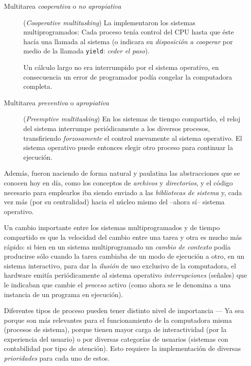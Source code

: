 \documentclass[11pt,fleqn]{book} %
\begin{document}
\begin{description}
\item[Multitarea \emph{cooperativa} o \emph{no apropiativa}] (\emph{Cooperative      multitasking}) La implementaron los sistemas multiprogramados: Cada
     proceso tenía control del CPU hasta que éste hacía una llamada al
     sistema (o indicara su \emph{disposición a cooperar} por medio de la
     llamada \texttt{yield}: \emph{ceder el paso}).

     Un cálculo largo no era interrumpido por el sistema operativo,
     en consecuencia un error de programador podía congelar la
     computadora completa.
\item[Multitarea \emph{preventiva} o \emph{apropiativa}] (\emph{Preemptive      multitasking}) En los sistemas de tiempo compartido, el reloj del
     sistema interrumpe periódicamente a los diversos procesos,
     transfiriendo \emph{forzosamente} el control nuevamente al sistema
     operativo. El sistema operativo puede entonces elegir 
     otro proceso para continuar la ejecución.
\end{description}

Además, fueron naciendo de forma natural y paulatina las abstracciones
que se conocen hoy en día, como los conceptos de \emph{archivos} y
\emph{directorios}, y el código necesario para emplearlos iba siendo
enviado a las \emph{bibliotecas de sistema} y, cada vez más (por
su centralidad) hacia el núcleo mismo del –ahora sí– sistema
operativo.

Un cambio importante
entre los sistemas multiprogramados y de tiempo compartido es que la
velocidad del cambio entre una tarea y otra es mucho más rápido: si
bien en un sistema multiprogramado un \emph{cambio de contexto} podía
producirse sólo cuando la tarea cambiaba de un modo de
ejecución a otro, en un sistema interactivo, para dar la \emph{ilusión} de uso exclusivo de la
computadora, el hardware emitía periódicamente al sistema operativo
\emph{interrupciones} (señales) que le indicaban que cambie el \emph{proceso} activo 
(como ahora se le denomina a una instancia de un programa en ejecución).

Diferentes tipos de proceso pueden tener distinto nivel de importancia
— Ya sea porque son más relevantes para el funcionamiento de la
computadora misma (procesos de sistema), porque tienen mayor carga de
interactividad (por la experiencia del usuario) o por diversas
categorías de usuarios (sistemas con contabilidad por tipo de
atención). Esto requiere la implementación de diversas \emph{prioridades}
para cada uno de estos.
\end{document}
